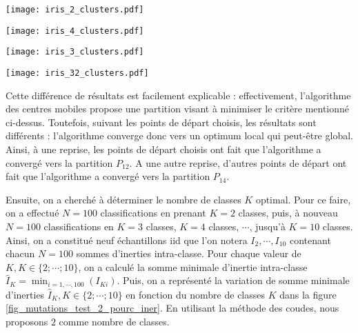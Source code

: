 \documentclass{article}
\begin{document}
\begin{multicols}{2}
\begingroup
	\centering
   \begin{minipage}[c]{0.23\textwidth}
      \centering \texttt{[image: iris\_2\_clusters.pdf]}
   \end{minipage}\hfill
   \begin{minipage}[c]{0.23\textwidth}   
      \centering \texttt{[image: iris\_4\_clusters.pdf]}
   \end{minipage}
     \label{fig_iris_2_4_clusters}
\endgroup

\begingroup
	\centering
   \begin{minipage}[c]{0.23\textwidth}
      \centering \texttt{[image: iris\_3\_clusters.pdf]}
   \end{minipage}\hfill
   \begin{minipage}[c]{0.23\textwidth}   
      \centering \texttt{[image: iris\_32\_clusters.pdf]}
   \end{minipage}
     \label{fig_iris_31_32_clusters}
\endgroup

Cette différence de résultats est facilement explicable : effectivement, l'algorithme des centres mobiles propose une partition visant à minimiser le critère mentionné ci-dessus. Toutefois, suivant les points de départ choisis, les résultats sont différents : l'algorithme converge donc vers un optimum local qui peut-être global. Ainsi, à une reprise, les points de départ choisis ont fait que l'algorithme a convergé vers la partition $P_{12}$. A une autre reprise, d'autres points de départ ont fait que l'algorithme a convergé vers la partition $P_{14}$.

Ensuite, on a cherché à déterminer le nombre de classes $K$ optimal. Pour ce faire, on a effectué $N = 100$ classifications en prenant $K = 2$ classes, puis, à nouveau $N = 100$ classifications en $K = 3$ classes, $K = 4$ classes, $\cdots$, jusqu'à $K = 10$ classes. Ainsi, on a constitué neuf échantillons iid que l'on notera $I_2, \cdots, I_{10}$ contenant chacun $N = 100$ sommes d'inerties intra-classe. Pour chaque valeur de $K, K \in \{2 ; \cdots; 10 \}$, on a calculé la somme minimale d'inertie intra-classe $\hat{I}_{K} = \min_{i = 1, \cdots, 100}(I_{Ki})$. Puis, on a représenté la variation de somme minimale d'inerties $\hat{I}_{K}, K \in \{2 ; \cdots; 10 \}$ en fonction du nombre de classes $K$ dans la figure \ref{fig_mutations_test_2_pourc_iner}. En utilisant la méthode des coudes, nous proposons $2$ comme nombre de classes. 



\end{multicols}
\end{document}
